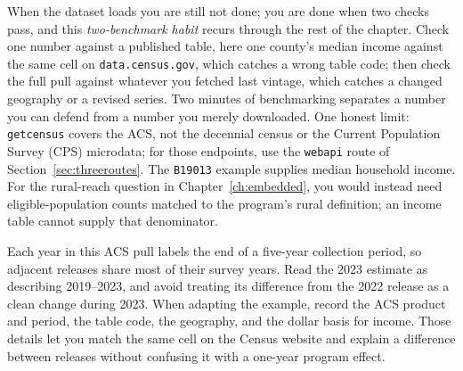 \documentclass[
    a4paper,
    fontsize=10pt,
    twoside=true,
    numbers=noenddot,
]{kaobook}
\begin{document}
When the dataset loads you are still not done; you are done when two checks pass, and this \emph{two-benchmark habit} recurs through the rest of the chapter. Check one number against a published table, here one county's median income against the same cell on \texttt{data.census.gov}, which catches a wrong table code; then check the full pull against whatever you fetched last vintage, which catches a changed geography or a revised series. Two minutes of benchmarking separates a number you can defend from a number you merely downloaded. One honest limit: \texttt{getcensus} covers the ACS, not the decennial census or the Current Population Survey (CPS) microdata; for those endpoints, use the \texttt{webapi} route of Section~\ref{sec:threeroutes}. The \texttt{B19013} example supplies median household income. For the rural-reach question in Chapter~\ref{ch:embedded}, you would instead need eligible-population counts matched to the program's rural definition; an income table cannot supply that denominator.

Each year in this ACS pull labels the end of a five-year collection period, so adjacent releases share most of their survey years. Read the 2023 estimate as describing 2019--2023, and avoid treating its difference from the 2022 release as a clean change during 2023. When adapting the example, record the ACS product and period, the table code, the geography, and the dollar basis for income. Those details let you match the same cell on the Census website and explain a difference between releases without confusing it with a one-year program effect.
\end{document}
